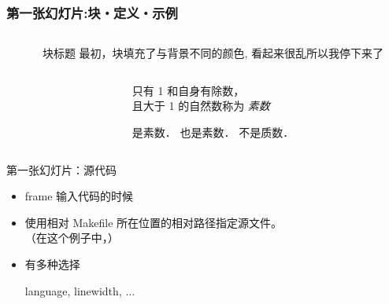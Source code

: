 \begin{frame}[fragile]
  \frametitle{第一张幻灯片:块・定义・示例}
  \begin{columns}
    \begin{column}{0.52\textwidth}
      
    \end{column}
    \begin{column}{0.48\textwidth}
      \begin{block}{块标题}
        最初，块填充了与背景不同的颜色,
        看起来很乱所以我停下来了
      \end{block}
    \end{column}
  \end{columns}
  \begin{columns}
    \begin{column}{0.52\textwidth}
      
    \end{column}
    \begin{column}{0.48\textwidth}
      \begin{definition}
        只有 1 和自身有除数，\\
        且大于 1 的自然数称为 \emph{素数}
      \end{definition}

      \begin{example}   
        \begin{itemize}
           是素数．
           也是素数．
           不是质数．
        \end{itemize}
      \end{example}
    \end{column}
  \end{columns}
\end{frame}

\begin{frame}[fragile]{第一张幻灯片：源代码}
  
  \begin{itemize}
    \item
    frame 输入代码的时候 
    \item
    使用相对 Makefile 所在位置的相对路径指定源文件。\\
    （在这个例子中，\hbox{}）
    \item
    有多种选择
    \begin{itemize}
      \egitem language, linewidth, $\dots$
    \end{itemize}
  \end{itemize}

\end{frame}

